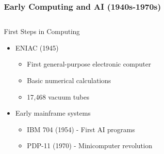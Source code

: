 \documentclass[aspectratio=169,t,xcolor=table]{beamer}
\begin{document}
\begin{frame}
    \frametitle{Early Computing and AI (1940s-1970s)}
    
    \begin{columns}[t] %
        \begin{column}{0.58\textwidth}
            \begin{block}{First Steps in Computing}
                \small %
                \begin{itemize}\setlength{\itemsep}{0pt} %
                    \item ENIAC (1945)
                    \begin{itemize}\setlength{\itemsep}{0pt}
                        \item First general-purpose electronic computer
                        \item Basic numerical calculations
                        \item 17,468 vacuum tubes
                    \end{itemize}
                    \item Early mainframe systems
                    \begin{itemize}\setlength{\itemsep}{0pt}
                        \item IBM 704 (1954) - First AI programs
                        \item PDP-11 (1970) - Minicomputer revolution
                    \end{itemize}
                \end{itemize}
            \end{block}
            
            \vspace{-0.2cm} %
            
        \end{column}
        

\end{columns}
\end{frame}
\end{document}

